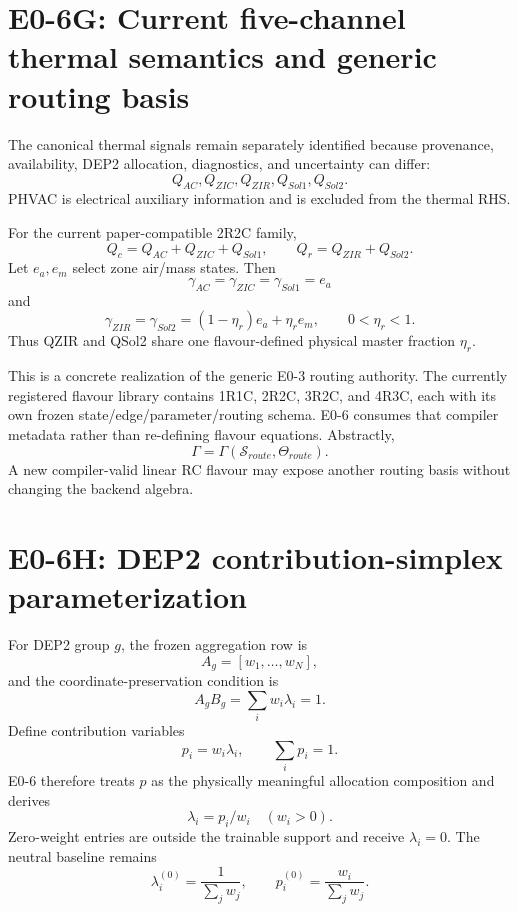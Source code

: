 \documentclass[11pt]{article}
\begin{document}
\section{E0-6G: Current five-channel thermal semantics and generic routing basis}

The canonical thermal signals remain separately identified because provenance,
availability, DEP2 allocation, diagnostics, and uncertainty can differ:
\[
\boxed{Q_{AC},Q_{ZIC},Q_{ZIR},Q_{Sol1},Q_{Sol2}.}
\]
PHVAC is electrical auxiliary information and is excluded from the thermal RHS.

For the current paper-compatible 2R2C family,
\[
\boxed{Q_c=Q_{AC}+Q_{ZIC}+Q_{Sol1}},\qquad
\boxed{Q_r=Q_{ZIR}+Q_{Sol2}}.
\]
Let $e_a,e_m$ select zone air/mass states. Then
\[
\boxed{\gamma_{AC}=\gamma_{ZIC}=\gamma_{Sol1}=e_a}
\]
and
\[
\boxed{
\gamma_{ZIR}=\gamma_{Sol2}=(1-\eta_r)e_a+\eta_r e_m,
\qquad 0<\eta_r<1.
}
\]
Thus QZIR and QSol2 share one flavour-defined physical master fraction
$\eta_r$.

This is a concrete realization of the generic E0-3 routing authority. The
currently registered flavour library contains 1R1C, 2R2C, 3R2C, and 4R3C, each
with its own frozen state/edge/parameter/routing schema. E0-6 consumes that
compiler metadata rather than re-defining flavour equations. Abstractly,
\[
\boxed{\Gamma=\Gamma(\mathcal S_{route},\Theta_{route}).}
\]
A new compiler-valid linear RC flavour may expose another routing basis without
changing the backend algebra.

\section{E0-6H: DEP2 contribution-simplex parameterization}

For DEP2 group $g$, the frozen aggregation row is
\[
A_g=[w_1,\ldots,w_N],
\]
and the coordinate-preservation condition is
\[
\boxed{A_gB_g=\sum_iw_i\lambda_i=1.}
\]
Define contribution variables
\[
\boxed{p_i=w_i\lambda_i},\qquad \boxed{\sum_i p_i=1}.
\]
E0-6 therefore treats $p$ as the physically meaningful allocation composition
and derives
\[
\boxed{\lambda_i=p_i/w_i\quad(w_i>0).}
\]
Zero-weight entries are outside the trainable support and receive $\lambda_i=0$.
The neutral baseline remains
\[
\lambda_i^{(0)}=\frac{1}{\sum_jw_j},\qquad
p_i^{(0)}=\frac{w_i}{\sum_jw_j}.
\]
\end{document}
